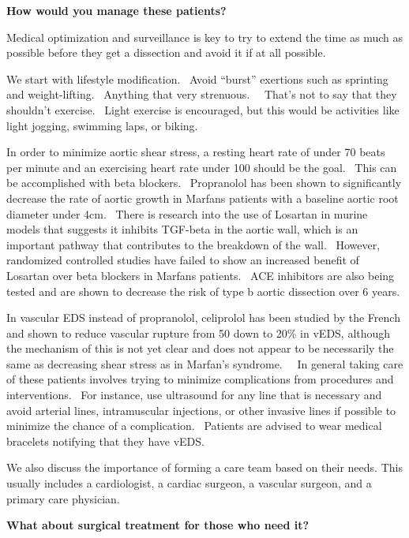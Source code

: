 \documentclass[
]{book}
\begin{document}
\textbf{How would you manage these patients?}

Medical optimization and surveillance is key to try to extend the time
as much as possible before they get a dissection and avoid it if at all
possible.~

We start with lifestyle modification.~ Avoid ``burst'' exertions such as
sprinting and weight-lifting.~ Anything that very strenuous.~~ That's
not to say that they shouldn't exercise.~ Light exercise is encouraged,
but this would be activities like light jogging, swimming laps, or
biking.~

In order to minimize aortic shear stress, a resting heart rate of under
70 beats per minute and an exercising heart rate under 100 should be the
goal.~ This can be accomplished with beta blockers.~ Propranolol has
been shown to significantly decrease the rate of aortic growth in
Marfans patients with a baseline aortic root diameter under 4cm.~ There
is research into the use of Losartan in murine models that suggests it
inhibits TGF-beta in the aortic wall, which is an important pathway that
contributes to the breakdown of the wall. ~However, randomized
controlled studies have failed to show an increased benefit of Losartan
over beta blockers in Marfans patients. ~ACE inhibitors are also being
tested and are shown to decrease the risk of type b aortic dissection
over 6 years.

In vascular EDS instead of propranolol, celiprolol has been studied by
the French and shown to reduce vascular rupture from 50 down to 20\% in
vEDS, although the mechanism of this is not yet clear and does not
appear to be necessarily the same as decreasing shear stress as in
Marfan's syndrome.~~ In general taking care of these patients involves
trying to minimize complications from procedures and interventions.~ For
instance, use ultrasound for any line that is necessary and avoid
arterial lines, intramuscular injections, or other invasive lines if
possible to minimize the chance of a complication.~ Patients are advised
to wear medical bracelets notifying that they have vEDS.

We also discuss the importance of forming a care team based on their
needs. This usually includes a cardiologist, a cardiac surgeon, a
vascular surgeon, and a primary care physician.

\textbf{What about surgical treatment for those who need it?}
\end{document}
